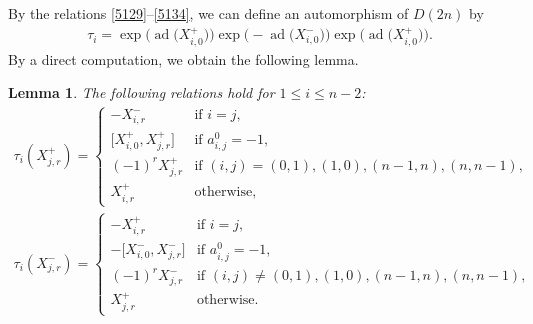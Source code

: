 \documentclass[10pt,a4paper]{amsart}
\numberwithin{equation}{section}
\newtheorem{Lemma}[Theorem]{Lemma}
\theoremstyle{definition}
\DeclareMathOperator{\ad}{ad}
\begin{document}
By the relations \eqref{5129}--\eqref{5134}, we can define an automorphism of $D(2n)$ by
\begin{gather*}
\tau_i=\exp\bigl(\ad\bigl(X^+_{i,0}\bigr)\bigr)\exp\bigl(-\ad\bigl(X^-_{i,0}\bigr)\bigr)\exp\bigl(\ad\bigl(X^+_{i,0}\bigr)\bigr).
\end{gather*}
By a direct computation, we obtain the following lemma.
\begin{Lemma}\label{Weyl}
The following relations hold for $1\leq i\leq n-2$:
\begin{gather*}
\tau_i(X^+_{j,r})=\begin{cases}
-X^-_{i,r}&\text{if }i=j,\\
\bigl[X^+_{i,0},X^+_{j,r}\bigr]&\text{if }a^0_{i,j}=-1,\\
(-1)^rX^+_{j,r}&\text{if }(i,j)=(0,1),(1,0),(n-1,n),(n,n-1),\\
X^+_{i,r}&\text{otherwise},
\end{cases}\\
\tau_i(X^-_{j,r})=\begin{cases}
-X^+_{i,r}&\text{if }i=j,\\
-\bigl[X^-_{i,0},X^-_{j,r}\bigr]&\text{if }a^0_{i,j}=-1,\\
(-1)^rX^-_{j,r}&\text{if }(i,j)\neq(0,1),(1,0),(n-1,n),(n,n-1),\\
X^+_{j,r}&\text{otherwise}.
\end{cases}
\end{gather*}
\end{Lemma}
\end{document}
